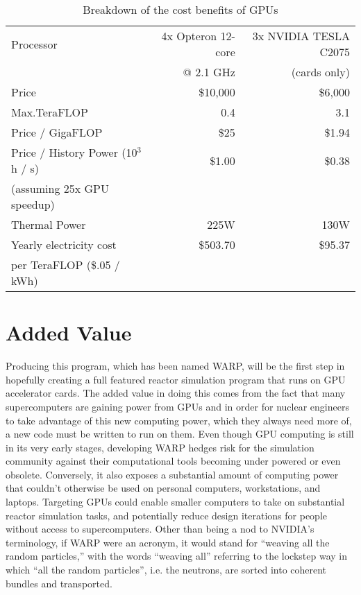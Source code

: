 \begin{table}[h]
\centering
\caption{Breakdown of the cost benefits of GPUs}
\label{gpu_money}
\begin{tabular}{| l | r | r |}
\hline
Processor & 4x Opteron 12-core  & 3x NVIDIA TESLA C2075 \\
  & @ 2.1 GHz &  (cards only)  \\
\hline
\hline
Price & \$10,000 & \$6,000 \\
\hline
Max.TeraFLOP & 0.4 & 3.1 \\
\hline
Price / GigaFLOP & \$25 & \$1.94 \\
\hline
Price / History Power (10$^3$ h / s) & \$1.00 & \$0.38 \\
(assuming 25x GPU speedup) & & \\
\hline
Thermal Power & 225W & 130W \\
\hline
Yearly electricity cost & \$503.70  & \$95.37 \\
per TeraFLOP (\$.05 / kWh)   & & \\
\hline
\end{tabular}
\end{table}

\section{Added Value}

Producing this program, which has been named WARP, will be the first step in hopefully creating a full featured reactor simulation program that runs on GPU accelerator cards.  The added value in doing this comes from the fact that many supercomputers are gaining power from GPUs and in order for nuclear engineers to take advantage of this new computing power, which they always need more of, a new code must be written to run on them.  Even though GPU computing is still in its very early stages, developing WARP hedges risk for the simulation community against their computational tools becoming under powered or even obsolete.  Conversely, it also exposes a substantial amount of  computing power that couldn't otherwise be used on personal computers, workstations, and laptops.  Targeting GPUs could enable smaller computers to take on substantial reactor simulation tasks, and potentially reduce design iterations for people without access to supercomputers.  Other than being a nod to NVIDIA's terminology, if WARP were an acronym, it would stand for ``weaving all the random particles,'' with the words ``weaving all'' referring to the lockstep way in which ``all the random particles'', i.e. the neutrons, are sorted into coherent bundles and transported.

